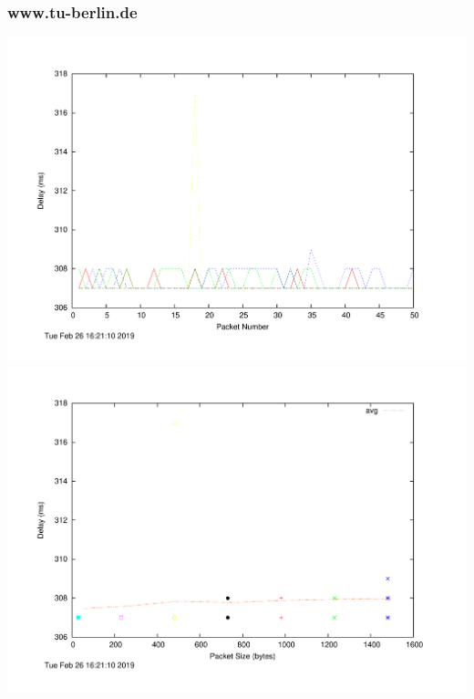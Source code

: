\documentclass{article}
\begin{document}
\subsubsection{www.tu-berlin.de}
\includegraphics[width=\textwidth]{berlin_delay.pdf}
\includegraphics[width=\textwidth]{berlin_scatter.pdf}
\end{document}
